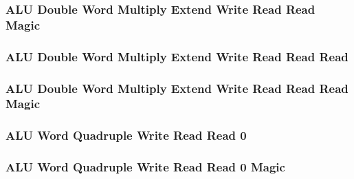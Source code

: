 \subsubsection[{\small ALU Double Word Multiply Extend Write Read Read Magic}]{ALU Double Word Multiply Extend Write Read Read Magic} \label{sec:format-ALU-DMEWRR.M}



\subsubsection[{\small ALU Double Word Multiply Extend Write Read Read Read}]{ALU Double Word Multiply Extend Write Read Read Read} \label{sec:format-ALU-DMEWRRR}



\subsubsection[{\small ALU Double Word Multiply Extend Write Read Read Read Magic}]{ALU Double Word Multiply Extend Write Read Read Read Magic} \label{sec:format-ALU-DMEWRRR.M}



\subsubsection[{\small ALU Word Quadruple Write Read Read 0}]{ALU Word Quadruple Write Read Read 0} \label{sec:format-ALU-QWRR0}



\subsubsection[{\small ALU Word Quadruple Write Read Read 0 Magic}]{ALU Word Quadruple Write Read Read 0 Magic} \label{sec:format-ALU-QWRR0.M}




